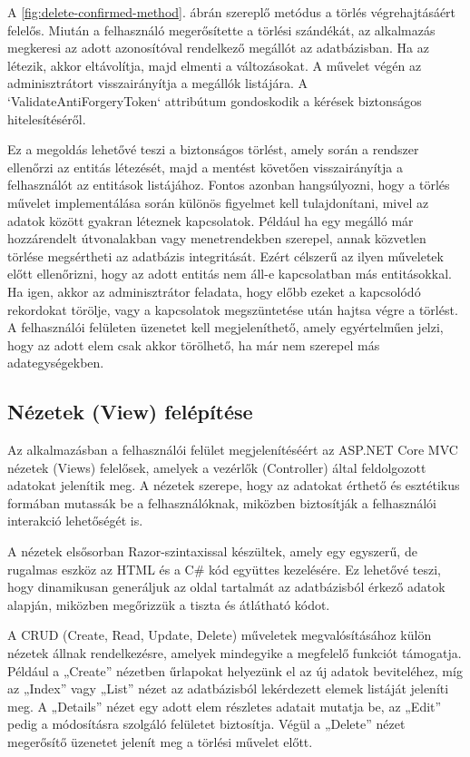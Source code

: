 A \ref{fig:delete-confirmed-method}. ábrán szereplő metódus a törlés végrehajtásáért felelős. Miután a felhasználó megerősítette a törlési szándékát, az alkalmazás megkeresi az adott azonosítóval rendelkező megállót az adatbázisban. Ha az létezik, akkor eltávolítja, majd elmenti a változásokat. A művelet végén az adminisztrátort visszairányítja a megállók listájára. A `ValidateAntiForgeryToken` attribútum gondoskodik a kérések biztonságos hitelesítéséről.

Ez a megoldás lehetővé teszi a biztonságos törlést, amely során a rendszer ellenőrzi az entitás létezését, majd a mentést követően visszairányítja a felhasználót az entitások listájához. Fontos azonban hangsúlyozni, hogy a törlés művelet implementálása során különös figyelmet kell tulajdonítani, mivel az adatok között gyakran léteznek kapcsolatok. Például ha egy megálló már hozzárendelt útvonalakban vagy menetrendekben szerepel, annak közvetlen törlése megsértheti az adatbázis integritását. Ezért célszerű az ilyen műveletek előtt ellenőrizni, hogy az adott entitás nem áll-e kapcsolatban más entitásokkal. Ha igen, akkor az adminisztrátor feladata, hogy előbb ezeket a kapcsolódó rekordokat törölje, vagy a kapcsolatok megszüntetése után hajtsa végre a törlést. A felhasználói felületen üzenetet kell megjeleníthető, amely egyértelműen jelzi, hogy az adott elem csak akkor törölhető, ha már nem szerepel más adategységekben.

\subsection{Nézetek (View) felépítése}

Az alkalmazásban a felhasználói felület megjelenítéséért az ASP.NET Core MVC nézetek (Views) felelősek, amelyek a vezérlők (Controller) által feldolgozott adatokat jelenítik meg. A nézetek szerepe, hogy az adatokat érthető és esztétikus formában mutassák be a felhasználóknak, miközben biztosítják a felhasználói interakció lehetőségét is.

A nézetek elsősorban Razor-szintaxissal készültek, amely egy egyszerű, de rugalmas eszköz az HTML és a C\# kód együttes kezelésére. Ez lehetővé teszi, hogy dinamikusan generáljuk az oldal tartalmát az adatbázisból érkező adatok alapján, miközben megőrizzük a tiszta és átlátható kódot.

A CRUD (Create, Read, Update, Delete) műveletek megvalósításához külön nézetek állnak rendelkezésre, amelyek mindegyike a megfelelő funkciót támogatja. Például a „Create” nézetben űrlapokat helyezünk el az új adatok beviteléhez, míg az „Index” vagy „List” nézet az adatbázisból lekérdezett elemek listáját jeleníti meg. A „Details” nézet egy adott elem részletes adatait mutatja be, az „Edit” pedig a módosításra szolgáló felületet biztosítja. Végül a „Delete” nézet megerősítő üzenetet jelenít meg a törlési művelet előtt.

